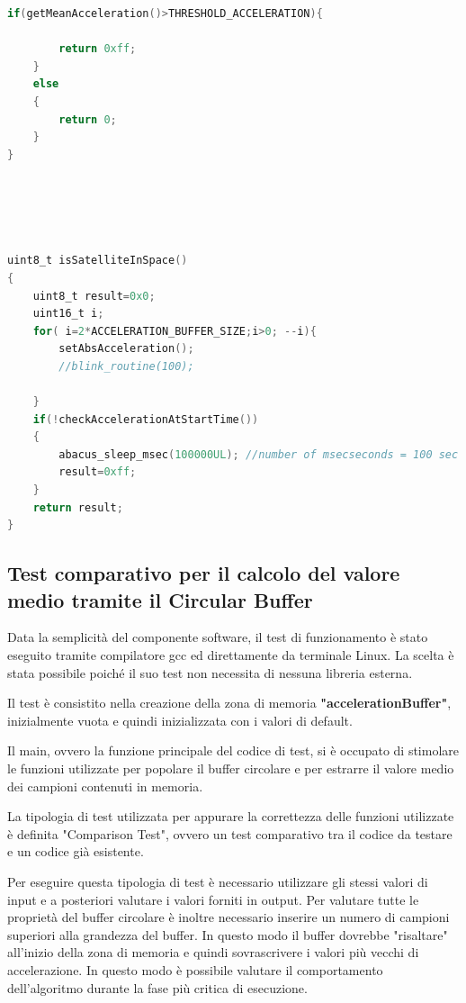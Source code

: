 \documentclass[LaM,binding=0.6cm]{../sapthesis}
\begin{document}
\begin{small}
\begin{lstlisting}[language=C]
    if(getMeanAcceleration()>THRESHOLD_ACCELERATION){

        return 0xff;
    }
    else
    {
        return 0;
    }
}





uint8_t isSatelliteInSpace()
{
    uint8_t result=0x0;
    uint16_t i;
    for( i=2*ACCELERATION_BUFFER_SIZE;i>0; --i){
        setAbsAcceleration();
        //blink_routine(100);

    }
    if(!checkAccelerationAtStartTime())
    {
        abacus_sleep_msec(100000UL); //number of msecseconds = 100 sec
        result=0xff;
    }
    return result;
}

\end{lstlisting}
\end{small}
\subsection{Test comparativo per il calcolo del valore medio tramite il Circular Buffer}

Data la semplicità del componente software, il test di funzionamento è stato eseguito tramite compilatore gcc ed direttamente da terminale Linux. La scelta è stata possibile poiché il suo test non necessita di nessuna libreria esterna.

Il test è consistito nella creazione della zona di memoria \textbf{"accelerationBuffer"}, inizialmente vuota e quindi inizializzata con i valori di default.

Il main, ovvero la funzione principale del codice di test, si è occupato di stimolare le funzioni utilizzate per popolare il buffer circolare e per estrarre il valore medio dei campioni contenuti in memoria.

La tipologia di test utilizzata per appurare la correttezza delle funzioni utilizzate è definita "Comparison Test", ovvero un test comparativo tra il codice da testare e un codice già esistente.

Per eseguire questa tipologia di test è necessario utilizzare gli stessi valori di input e a posteriori valutare i valori forniti in output. Per valutare tutte le proprietà del buffer circolare è inoltre necessario inserire un numero di campioni superiori alla grandezza del buffer. In questo modo il buffer dovrebbe "risaltare" all'inizio della zona di memoria e quindi sovrascrivere i valori più vecchi di accelerazione. In questo modo è possibile valutare il comportamento dell'algoritmo durante la fase più critica di esecuzione.
\end{document}
